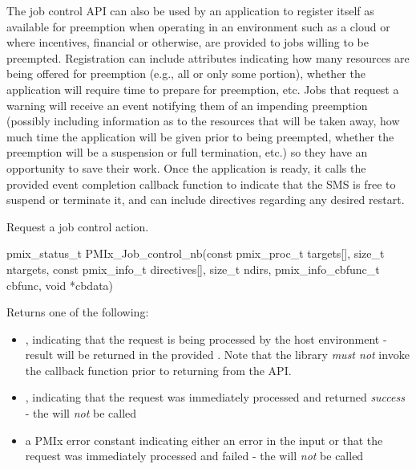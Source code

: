 The job control API can also be used by an application to register itself as available for preemption when operating in an environment such as a cloud or where incentives, financial or otherwise, are provided to jobs willing to be preempted. Registration can include attributes indicating how many resources are being offered for preemption (e.g., all or only some portion), whether the application will require time to prepare for preemption, etc. Jobs that
request a warning will receive an event notifying them of an impending preemption (possibly including information as to the resources that will be taken away, how much time the application will be given prior to being preempted, whether the preemption will be a suspension or full termination, etc.) so they have an opportunity to save
their work. Once the application is ready, it calls the provided event completion callback function to indicate that
the SMS is free to suspend or terminate it, and can include directives regarding any desired restart.

\summary

Request a job control action.

\format

\cspecificstart
\begin{codepar}
pmix_status_t
PMIx_Job_control_nb(const pmix_proc_t targets[], size_t ntargets,
                    const pmix_info_t directives[], size_t ndirs,
                    pmix_info_cbfunc_t cbfunc, void *cbdata)
\end{codepar}
\cspecificend

\begin{arglist}
\end{arglist}

Returns one of the following:

\begin{itemize}
    \item {}, indicating that the request is being processed by the host environment - result will be returned in the provided . Note that the library \emph{must not} invoke the callback function prior to returning from the \ac{API}.
    \item {}, indicating that the request was immediately processed and returned \textit{success} - the  will \textit{not} be called
    \item a PMIx error constant indicating either an error in the input or that the request was immediately processed and failed - the  will \textit{not} be called
\end{itemize}

